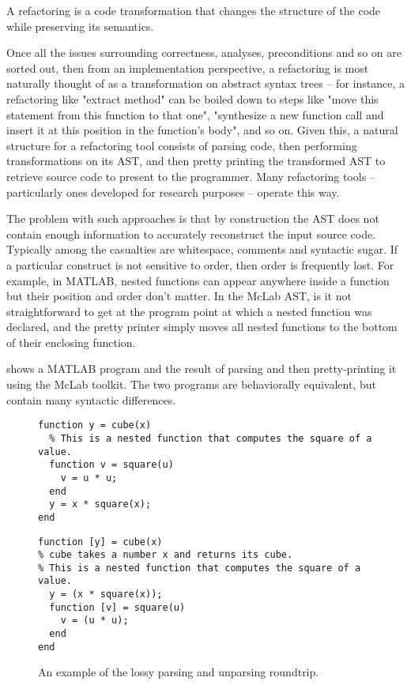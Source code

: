 A refactoring is a code transformation that changes the structure of the code
while preserving its semantics.

Once all the issues surrounding correctness, analyses, preconditions and so on
are sorted out, then from an implementation perspective, a refactoring is most
naturally thought of as a transformation on abstract syntax trees -- for
instance, a refactoring like "extract method" can be boiled down to steps like
"move this statement from this function to that one", "synthesize a new function
call and insert it at this position in the function's body", and so on. Given this,
a natural structure for a refactoring tool consists of parsing code, then performing
transformations on its AST, and then pretty printing the transformed AST to retrieve
source code to present to the programmer. Many refactoring tools -- particularly
ones developed for research purposes -- operate this way.

The problem with such approaches is that by construction the AST does not contain
enough information to accurately reconstruct the input source code. Typically
among the casualties are whitespace, comments and syntactic sugar. If a particular
construct is not sensitive to order, then order is frequently lost. For example,
in MATLAB, nested functions can appear anywhere inside a function but their position
and order don't matter. In the McLab AST, is it not straightforward to get at the
program point at which a nested function was declared, and the pretty printer simply
moves all nested functions to the bottom of their enclosing function.

 shows a MATLAB program and the result of parsing and then
pretty-printing it using the McLab toolkit. The two programs are behaviorally
equivalent, but contain many syntactic differences.

\begin{figure}
\begin{minipage}{0.5\linewidth}
\begin{lstlisting}[numbers=none]
% cube takes a number x and returns its cube.
function y = cube(x)
  % This is a nested function that computes the square of a value.
  function v = square(u)
    v = u * u;
  end
  y = x * square(x);
end
\end{lstlisting}
\end{minipage}
\hfill
\hspace{.3cm}
\hfill
\begin{minipage}{0.5\linewidth}
\begin{lstlisting}[numbers=none]
function [y] = cube(x)
% cube takes a number x and returns its cube.
% This is a nested function that computes the square of a value.
  y = (x * square(x));
  function [v] = square(u)
    v = (u * u);
  end
end
\end{lstlisting}
\end{minipage}
\caption{An example of the lossy parsing and unparsing roundtrip.}
\label{Fig:LostLayout}
\end{figure}

